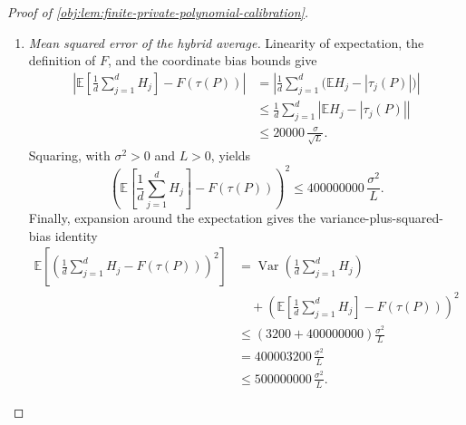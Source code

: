 \begin{proof}[Proof of \cref{obj:lem:finite-private-polynomial-calibration}]
\begin{enumerate}
We absorb the dimension factor using \(L\ge4096\). The elementary exponential lower bound gives
\[
\frac L4\le e^{L/4},
\qquad
L^2\le16e^{L/2},
\]
and
\[
4\le\frac{49L}{100}
=1+\left(\frac{49L}{100}-1\right)
\le e^{49L/100-1}.
\]
Since \(e^{L-1}=d\), it follows that
\[
\begin{aligned}
L^2e^{L/100}
&\le16e^{L/2}e^{L/100}\\
&=16e^{51L/100}\\
&\le4e^{51L/100}e^{49L/100-1}
=4d.
\end{aligned}
\]
As \(d,L>0\), this proves
\[
\frac{800\sigma^2Le^{L/100}}d
\le\frac{3200\sigma^2}{L},
\qquad
\operatorname{Var}\left(\frac1d\sum_{j=1}^dH_j\right)
\le\frac{3200\sigma^2}{L}.
\]

\item \textit{Mean squared error of the hybrid average.}
Linearity of expectation, the definition of \(F\), and the coordinate bias bounds give
\[
\begin{aligned}
\left|\mathbb E\left[\frac1d\sum_{j=1}^dH_j\right]
      -F(\tau(P))\right|
&=\left|\frac1d\sum_{j=1}^d
       \bigl(\mathbb EH_j-|\tau_j(P)|\bigr)\right|\\
&\le\frac1d\sum_{j=1}^d
       \left|\mathbb EH_j-|\tau_j(P)|\right|\\
&\le20000\,\frac{\sigma}{\sqrt L}.
\end{aligned}
\]
Squaring, with \(\sigma^2>0\) and \(L>0\), yields
\[
\left(\mathbb E\left[\frac1d\sum_{j=1}^dH_j\right]
      -F(\tau(P))\right)^2
\le400000000\,\frac{\sigma^2}{L}.
\]
Finally, expansion around the expectation gives the variance-plus-squared-bias identity
\[
\begin{aligned}
\mathbb E\left[
 \left(\frac1d\sum_{j=1}^dH_j-F(\tau(P))\right)^2\right]
&=\operatorname{Var}\left(\frac1d\sum_{j=1}^dH_j\right)\\
&\quad+\left(\mathbb E\left[\frac1d\sum_{j=1}^dH_j\right]
             -F(\tau(P))\right)^2\\
&\le(3200+400000000)\frac{\sigma^2}{L}\\
&=400003200\,\frac{\sigma^2}{L}\\
&\le500000000\,\frac{\sigma^2}{L}.
\end{aligned}
\]
\end{enumerate}
\end{proof}

